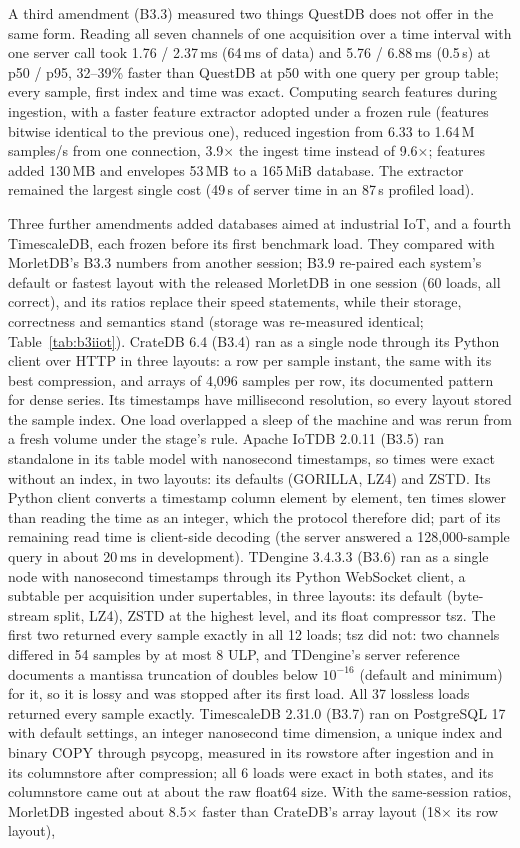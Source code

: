 \documentclass[sigconf,nonacm]{acmart}
\newcommand{\M}{MorletDB}
\begin{document}
A third amendment (B3.3) measured two things QuestDB does not offer in the same form. Reading all seven channels of one acquisition over a time interval with one server call took 1.76 / 2.37\,ms (64\,ms of data) and 5.76 / 6.88\,ms (0.5\,s) at p50 / p95, 32--39\% faster than QuestDB at p50 with one query per group table; every sample, first index and time was exact. Computing search features during ingestion, with a faster feature extractor adopted under a frozen rule (features bitwise identical to the previous one), reduced ingestion from 6.33 to 1.64\,M samples/s from one connection, 3.9$\times$ the ingest time instead of 9.6$\times$; features added 130\,MB and envelopes 53\,MB to a 165\,MiB database. The extractor remained the largest single cost (49\,s of server time in an 87\,s profiled load).

Three further amendments added databases aimed at industrial IoT, and a fourth TimescaleDB, each frozen before its first benchmark load. They compared with \M{}'s B3.3 numbers from another session; B3.9 re-paired each system's default or fastest layout with the released \M{} in one session (60 loads, all correct), and its ratios replace their speed statements, while their storage, correctness and semantics stand (storage was re-measured identical; Table~\ref{tab:b3iiot}). CrateDB 6.4 (B3.4) ran as a single node through its Python client over HTTP in three layouts: a row per sample instant, the same with its best compression, and arrays of 4,096 samples per row, its documented pattern for dense series. Its timestamps have millisecond resolution, so every layout stored the sample index. One load overlapped a sleep of the machine and was rerun from a fresh volume under the stage's rule. Apache IoTDB 2.0.11 (B3.5) ran standalone in its table model with nanosecond timestamps, so times were exact without an index, in two layouts: its defaults (GORILLA, LZ4) and ZSTD. Its Python client converts a timestamp column element by element, ten times slower than reading the time as an integer, which the protocol therefore did; part of its remaining read time is client-side decoding (the server answered a 128,000-sample query in about 20\,ms in development). TDengine 3.4.3.3 (B3.6) ran as a single node with nanosecond timestamps through its Python WebSocket client, a subtable per acquisition under supertables, in three layouts: its default (byte-stream split, LZ4), ZSTD at the highest level, and its float compressor tsz. The first two returned every sample exactly in all 12 loads; tsz did not: two channels differed in 54 samples by at most 8 ULP, and TDengine's server reference documents a mantissa truncation of doubles below $10^{-16}$ (default and minimum) for it, so it is lossy and was stopped after its first load. All 37 lossless loads returned every sample exactly. TimescaleDB 2.31.0 (B3.7) ran on PostgreSQL 17 with default settings, an integer nanosecond time dimension, a unique index and binary COPY through psycopg, measured in its rowstore after ingestion and in its columnstore after compression; all 6 loads were exact in both states, and its columnstore came out at about the raw float64 size. With the same-session ratios, \M{} ingested about 8.5$\times$ faster than CrateDB's array layout (18$\times$ its row layout), 
\end{document}
